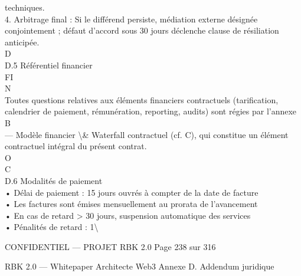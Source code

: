 \documentclass[12pt,landscape,a4paper]{article}
\newenvironment{confidential}
{\begin{tcolorbox}[
    colback=rbkred!5!white,
    colframe=rbkred!75!black,
    title=CONFIDENTIEL,
    fonttitle=\bfseries\color{white},
    coltitle=rbkred!75!black,
    breakable,
    enhanced,
    frame hidden,
    borderline west={2pt}{0pt}{rbkred!75!black}
]}
{\end{tcolorbox}}
\begin{document}
techniques.\\
\vspace{0.5em}
4. Arbitrage final : Si le différend persiste, médiation externe désignée conjointement ; défaut d’accord sous 30 jours déclenche clause de résiliation anticipée.\\
\vspace{0.5em}
\vspace{0.5em}
\vspace{0.5em}
\vspace{0.5em}
D\\
D.5 Référentiel financier\\
FI\\
N\\
Toutes questions relatives aux éléments financiers contractuels (tarification, calendrier de paiement, rémunération, reporting, audits) sont régies par l’annexe B\\
— Modèle financier \textbackslash{}& Waterfall contractuel (cf. C), qui constitue un élément contractuel intégral du présent contrat.\\
O\\
C\\
\vspace{0.5em}
\vspace{0.5em}
D.6 Modalités de paiement\\
• Délai de paiement : 15 jours ouvrés à compter de la date de facture\\
\vspace{0.5em}
• Les factures sont émises mensuellement au prorata de l’avancement\\
\vspace{0.5em}
• En cas de retard \textgreater{} 30 jours, suspension automatique des services\\
\vspace{0.5em}
• Pénalités de retard : 1\textbackslash{}%
\vspace{0.5em}
\vspace{0.5em}
\vspace{0.5em}
\begin{confidential}CONFIDENTIEL — PROJET RBK 2.0                                              Page 238 sur 316\end{confidential}
RBK 2.0 — Whitepaper Architecte Web3                                                                                           Annexe D. Addendum juridique\\
\vspace{0.5em}
\end{document}
